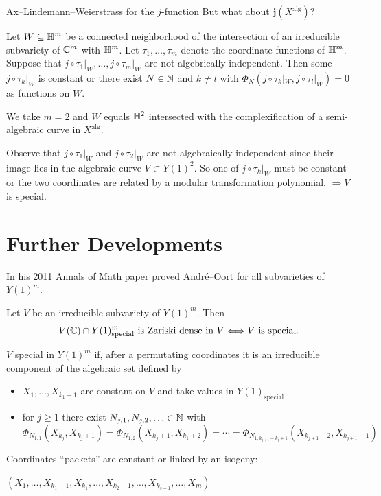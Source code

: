 \documentclass{beamer}
\begin{document}
\begin{frame}{Ax--Lindemann--Weierstrass for the $j$-function}
  But what about $\boldsymbol{j}(X^{\mathrm{alg}})$?

  \begin{theorem}[Pila, 2011]
    Let $W\subseteq{\mathbb{H}}^m$ be a connected neighborhood of the
    intersection of an
    irreducible subvariety of ${\mathbb{C}}^m$ with ${\mathbb{H}}^m$.
    Let $\tau_1,\ldots,\tau_m$ denote the coordinate functions of ${\mathbb{H}}^m$.
    Suppose that $j\circ {\tau_1|}_{W},\ldots,j\circ {\tau_m}|_{W}$
    are \alert{not} algebrically independent.
    Then some $j\circ{\tau_k}|_W$ is constant or
  there exist $N\in{\mathbb{N}}$ and 
    $k\not=l$ with $\Phi_N(j\circ \tau_k|_W,j\circ \tau_l|_W)=0$ as
    functions on $W$.    
  \end{theorem}
  \vspace{-.2cm}
  
  We take $m=2$ and  $W$ equals ${\mathbb{H}}^2$
  intersected with the complexification of a semi-algebraic curve in $X^{\mathrm{alg}}$.
  
  Observe that $j\circ \tau_1|_W$ and $j\circ \tau_2|_W$ are not
  algebraically independent since their image lies in the algebraic curve
  $V\subset Y(1)^2$.
  So one of $j\circ \tau_k|_W$ must be constant or the two coordinates
  are related by a modular transformation polynomial. 
  $\Rightarrow V$ is \alert{special}.  
\end{frame}

\section{Further Developments}

\begin{frame}
  In his 2011 Annals of Math paper proved Andr\'e--Oort for
  all subvarieties of $Y(1)^m$.

  \begin{theorem}[Pila]
    Let $V$ be an irreducible subvariety of $Y(1)^m$. Then
    $$V({\mathbb{C}})\cap
    Y(1)^{m}_{\mathrm{special}}\text{ is Zariski dense in
      $V$}\Longleftrightarrow V\text{ is special.}$$
  \end{theorem}

  $V$ special in $Y(1)^m$ if, after a  permutating coordinates
  it is an irreducible component of the algebraic set defined by
  \begin{itemize}
  \item $X_{1},\ldots,X_{k_1-1}$ are constant on $V$ and take values in
    $Y(1)_{\mathrm{special}}$
  \item for $j\ge 1$ there exist $N_{j,1},N_{j,2},\ldots\in{\mathbb{N}}$ with 
    $\Phi_{N_{1,1}}(X_{k_j},X_{k_j+1})=\Phi_{N_{1,2}}(X_{k_j+1},X_{k_1+2})
    = \cdots =\Phi_{N_{1,k_{j+1}-k_j+1}}(X_{k_{j+1}-2},X_{k_{j+1}-1})$
  \end{itemize}
  Coordinates ``packets'' are constant or linked by an isogeny:
  \vspace{-.2cm}
  \begin{center}
  $(X_1,\ldots,X_{k_1-1},X_{k_1},\ldots,X_{k_2-1},\ldots,
  X_{k_{s-1}},\ldots,X_m)$      
  \end{center}  
\end{frame}
\end{document}
